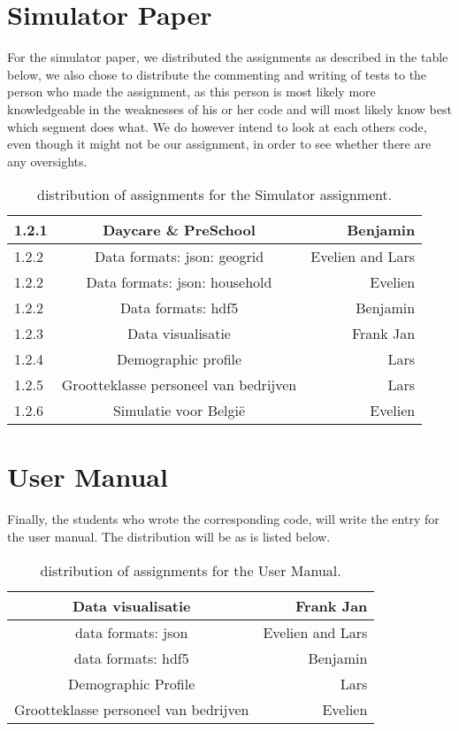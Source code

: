 \documentclass{article}
\begin{document}
\section{Simulator Paper}
For the simulator paper, we distributed the assignments as described in the table below, we also chose to distribute the commenting and writing of tests to the person who made the assignment, as this person is most likely more knowledgeable in the weaknesses of his or her code and will most likely know best which segment does what. We do however intend to look at each others code, even though it might not be our assignment, in order to see whether there are any oversights.
\begin{table}[h!]
	\centering
	\begin{tabular}{| l | c | r |}
		\hline
		1.2.1 & Daycare \& PreSchool & Benjamin \\
		\hline
		1.2.2 & Data formats: json: geogrid & Evelien and Lars \\
		\hline
		1.2.2 & Data formats: json: household & Evelien \\
		\hline
		1.2.2 & Data formats: hdf5 & Benjamin \\
		\hline
		1.2.3 & Data visualisatie & Frank Jan \\
		\hline
		1.2.4 & Demographic profile & Lars \\
		\hline
		1.2.5 & Grootteklasse personeel van bedrijven & Lars \\
		\hline
		1.2.6 & Simulatie voor Belgi\"e & Evelien \\
		\hline
	\end{tabular}
	\caption{distribution of assignments for the Simulator assignment.}
\end{table}
\section{User Manual}
Finally, the students who wrote the corresponding code, will write the entry for the user manual. The distribution will be as is listed below.
\begin{table}[h!]
	\centering
	\begin{tabular}{| c | r |}
		\hline
		Data visualisatie & Frank Jan \\
		\hline
		data formats: json & Evelien and Lars \\
		\hline
		data formats: hdf5 & Benjamin \\
		\hline
		Demographic Profile & Lars \\
		\hline
		Grootteklasse personeel van bedrijven & Evelien \\
		\hline
	\end{tabular}
	\caption{distribution of assignments for the User Manual.}
\end{table}
\end{document}
